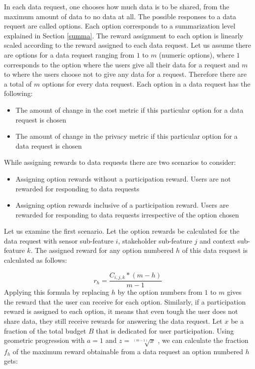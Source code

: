 In each data request, one chooses how much data is to be shared, from the maximum amount of data to no data at all. The possible responses to a data request are called options. Each option corresponds to a summarization level explained in Section \ref{summa}. The reward assignment to each option is linearly scaled according
to the reward assigned to each data request. Let us assume there are options for a data request ranging from $1$ to $m$ (numeric options), where $1$ corresponds to the option where the users give all their data for a request and $m$ to where the users choose not to give any data for a request. Therefore there are a total of $m$ options for every data request. Each option in a data request has the following:

\begin{itemize}
\item The amount of change in the cost metric if this particular option for a data request is chosen
\item The amount of change in the privacy metric if this particular option for a data request is chosen
\end{itemize}

While assigning rewards to data requests there are two scenarios to consider:

\begin{itemize}
\item Assigning option rewards without a participation reward. Users are not rewarded for responding to data requests
\item Assigning option rewards inclusive of a participation reward. Users are rewarded for responding to data requests irrespective of the option chosen
\end{itemize}

Let us examine the first scenario. Let the option rewards be calculated for the data request with sensor sub-feature $i$, stakeholder sub-feature $j$ and
context sub-feature $k$. The assigned reward for any option numbered $h$ of this data request is calculated as follows:

\begin{equation}
r_{h} =  \frac{C_{i,j,k}*(m-h)}{m-1}
\end{equation}
Applying this formula by replacing $h$ by the option numbers from $1$ to $m$ gives the reward that the user can receive for each option.
Similarly, if a participation reward is assigned to each option, it means that even tough the user does not share data, they still
receive rewards for answering the data request. Let $x$ be a fraction of the total budget $B$ that is dedicated for user participation. Using geometric progression with $a=1$ and $z=\sqrt[(m-1)]{x}$ , we can calculate the fraction $f_{h}$ of the maximum reward obtainable from a data request an option numbered $h$ gets:

